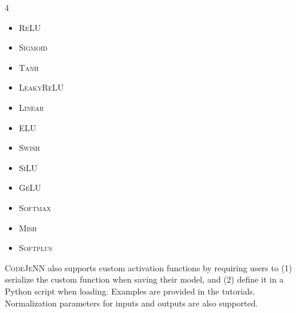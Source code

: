 \documentclass[preprint,12pt, a4paper]{elsarticle}
\begin{document}
\begin{multicols}{4}
\raggedcolumns 
    \begin{itemize}[itemsep=-5pt, topsep=0pt, leftmargin=*]
        \item[] \textsc{ReLU} \cite{nair_rectified_2010}
        \item[] \textsc{Sigmoid}
        \item[] \textsc{Tanh}
        \item[] \textsc{LeakyReLU} \cite{he_delving_2015}
        \item[] \textsc{Linear}
        \item[] \textsc{ELU} \cite{clevert_fast_2016}
        \item[] \textsc{Swish} \cite{ramachandran_searching_2017}
        \item[] \textsc{SiLU} \cite{ramachandran_searching_2017}
        \item[] \textsc{GeLU} \cite{hendrycks_gaussian_2023}
        \item[] \textsc{Softmax}
        \item[] \textsc{Mish} \cite{misra_mish_2020}
        \item[] \textsc{Softplus} \cite{dugas_incorporating_2000}
    \end{itemize}
\end{multicols}

\noindent 
\textsc{CodeJeNN} also supports custom activation functions by requiring users to (1) serialize the custom function when saving their model, and (2) define it in a Python script when loading. Examples are provided in the tutorials. Normalization parameters for inputs and outputs are also supported.
\end{document}
